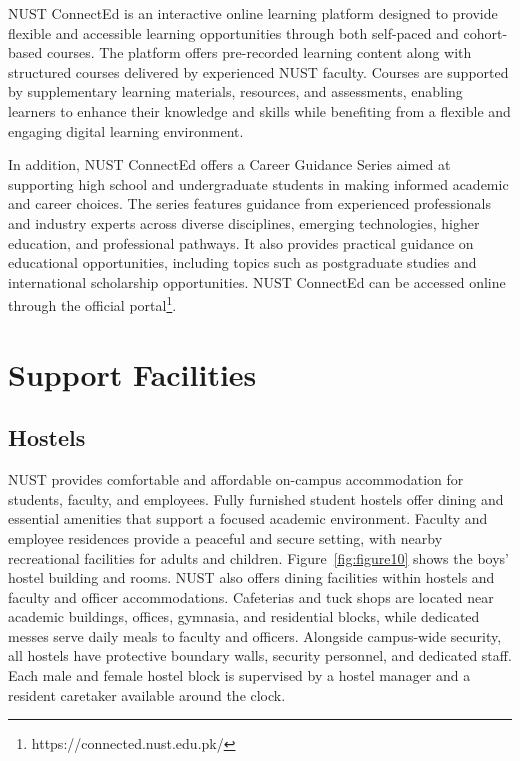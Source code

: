 NUST ConnectEd is an interactive online learning platform designed to provide flexible and accessible learning opportunities through both self-paced and cohort-based courses. The platform offers pre-recorded learning content along with structured courses delivered by experienced NUST faculty. Courses are supported by supplementary learning materials, resources, and assessments, enabling learners to enhance their knowledge and skills while benefiting from a flexible and engaging digital learning environment.

In addition, NUST ConnectEd offers a Career Guidance Series aimed at supporting high school and undergraduate students in making informed academic and career choices. The series features guidance from experienced professionals and industry experts across diverse disciplines, emerging technologies, higher education, and professional pathways. It also provides practical guidance on educational opportunities, including topics such as postgraduate studies and international scholarship opportunities.
NUST ConnectEd can be accessed online through the official portal\footnote{https://connected.nust.edu.pk/}.


\hypertarget{support-facilities}{%
\section{Support Facilities}\label{support-facilities}}

\hypertarget{hostels}{%
\subsection{Hostels}\label{hostels}}

NUST provides comfortable and affordable on-campus accommodation for students, faculty, and employees. Fully furnished student hostels offer dining and essential amenities that support a focused academic environment. Faculty and employee residences provide a peaceful and secure setting, with nearby recreational facilities for adults and children. Figure~\ref{fig:figure10} shows the boys’ hostel building and rooms. NUST also offers dining facilities within hostels and faculty and officer accommodations. Cafeterias and tuck shops are located near academic buildings, offices, gymnasia, and residential blocks, while dedicated messes serve daily meals to faculty and officers.
Alongside campus-wide security, all hostels have protective boundary walls, security personnel, and dedicated staff. Each male and female hostel block is supervised by a hostel manager and a resident caretaker available around the clock.

